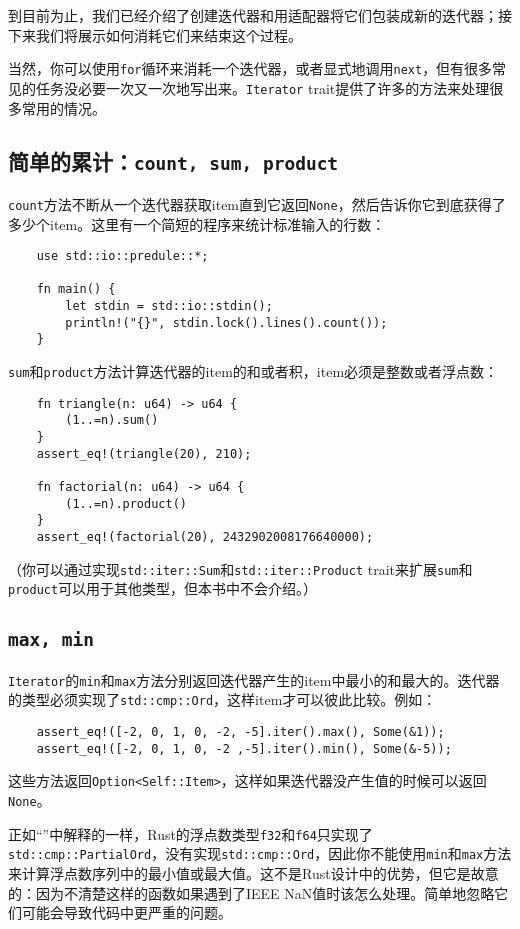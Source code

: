 到目前为止，我们已经介绍了创建迭代器和用适配器将它们包装成新的迭代器；接下来我们将展示如何消耗它们来结束这个过程。

当然，你可以使用\texttt{for}循环来消耗一个迭代器，或者显式地调用\texttt{next}，但有很多常见的任务没必要一次又一次地写出来。\texttt{Iterator} trait提供了许多的方法来处理很多常用的情况。

\subsection{简单的累计：\texttt{count, sum, product}}
\texttt{count}方法不断从一个迭代器获取item直到它返回\texttt{None}，然后告诉你它到底获得了多少个item。这里有一个简短的程序来统计标准输入的行数：
\begin{verbatim}
    use std::io::predule::*;

    fn main() {
        let stdin = std::io::stdin();
        println!("{}", stdin.lock().lines().count());
    }
\end{verbatim}

\texttt{sum}和\texttt{product}方法计算迭代器的item的和或者积，item必须是整数或者浮点数：
\begin{verbatim}
    fn triangle(n: u64) -> u64 {
        (1..=n).sum()
    }
    assert_eq!(triangle(20), 210);

    fn factorial(n: u64) -> u64 {
        (1..=n).product()
    }
    assert_eq!(factorial(20), 2432902008176640000);
\end{verbatim}

（你可以通过实现\texttt{std::iter::Sum}和\texttt{std::iter::Product} trait来扩展\texttt{sum}和\texttt{product}可以用于其他类型，但本书中不会介绍。）

\subsection{\texttt{max, min}}
\texttt{Iterator}的\texttt{min}和\texttt{max}方法分别返回迭代器产生的item中最小的和最大的。迭代器的类型必须实现了\texttt{std::cmp::Ord}，这样item才可以彼此比较。例如：
\begin{verbatim}
    assert_eq!([-2, 0, 1, 0, -2, -5].iter().max(), Some(&1));
    assert_eq!([-2, 0, 1, 0, -2 ,-5].iter().min(), Some(&-5));
\end{verbatim}

这些方法返回\texttt{Option<Self::Item>}，这样如果迭代器没产生值的时候可以返回\texttt{None}。

正如“”中解释的一样，Rust的浮点数类型\texttt{f32}和\texttt{f64}只实现了\texttt{std::cmp::PartialOrd}，没有实现\texttt{std::cmp::Ord}，因此你不能使用\texttt{min}和\texttt{max}方法来计算浮点数序列中的最小值或最大值。这不是Rust设计中的优势，但它是故意的：因为不清楚这样的函数如果遇到了IEEE NaN值时该怎么处理。简单地忽略它们可能会导致代码中更严重的问题。

